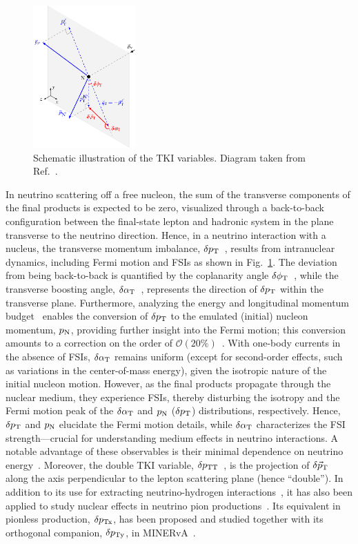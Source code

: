 \begin{figure}[!htb] 	
    \centering 		
    \includegraphics[width=0.35\textwidth]{figures/stki.eps}
    \caption{\label{fig:stki} Schematic illustration of the TKI variables. Diagram taken from Ref.~\cite{Lu:2015tcr}.} 
\end{figure}

In neutrino scattering off a free nucleon, the sum of the transverse components of the final products is expected to be zero, visualized through a back-to-back configuration between the final-state lepton and hadronic system in the  plane transverse to the neutrino direction. Hence, in a neutrino interaction with a nucleus, the transverse momentum imbalance, $\delta p_\textrm{T}$~\cite{Lu:2015tcr}, results from intranuclear dynamics, including Fermi motion and FSIs  as shown in Fig.~\ref{fig:stki}. The deviation from being back-to-back is quantified by the  coplanarity angle $\delta\phi_\textrm{T}$~\cite{Lu:2015tcr}, while the transverse boosting angle, $\delta\alpha_\textrm{T}$~\cite{Lu:2015tcr}, represents the direction of $\delta p_\textrm{T}$ within the transverse plane. Furthermore, analyzing the energy and longitudinal momentum budget~\cite{Furmanski:2016wqo, Lu:2019nmf} enables the conversion of $\delta p_\textrm{T}$ to the emulated (initial) nucleon momentum, $p_\textrm{N}$,  providing further insight into the Fermi motion; this conversion amounts to a correction on the order of $\mathcal{O}(20\%)$~\cite{Yang:2023dxk}. 
With one-body currents in the absence of FSIs, $\delta\alpha_\textrm{T}$ remains uniform (except for second-order effects, such as variations in the center-of-mass energy), given the isotropic nature of the initial nucleon motion. However, as the final products propagate through the nuclear medium, they experience FSIs, thereby disturbing the isotropy and the Fermi motion peak of the $\delta\alpha_\textrm{T}$ and $p_\textrm{N}$ ($\delta p_\textrm{T}$) distributions, respectively. Hence, $\delta p_\textrm{T}$ and $p_\textrm{N}$ elucidate the Fermi motion details, while $\delta\alpha_\textrm{T}$  characterizes the FSI strength---crucial for understanding medium effects in neutrino interactions. A notable advantage of these observables is their minimal dependence on neutrino energy~\cite{Lu:2015tcr}. Moreover, the double TKI variable, $\delta p_\textrm{TT}$~\cite{Lu:2015hea}, is the projection of $\delta \vec{p}_\textrm{T}$ along the axis perpendicular to the lepton scattering plane (hence ``double''). In addition to its use for extracting neutrino-hydrogen interactions~\cite{Lu:2015hea, Hamacher-Baumann:2020ogq}, it has also been applied to study nuclear effects in neutrino pion productions~\cite{MINERvA:2020anu, T2K:2021naz}. Its equivalent in pionless production, $\delta p_\textrm{Tx}$, has been proposed and studied together with its orthogonal companion, $\delta p_\textrm{Ty}$, in MINERvA~\cite{MINERvA:2019ope}.